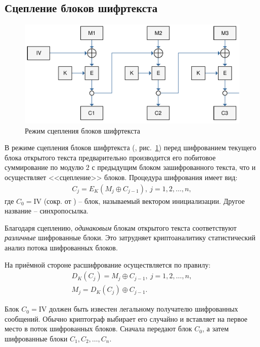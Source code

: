 \subsection{Сцепление блоков шифртекста}

\begin{figure}[bt]
	\centering
	\includegraphics[width=1\textwidth]{pic/CBC}
	\caption{Режим сцепления блоков шифртекста}
	\label{fig:CBC}
\end{figure}

В режиме сцепления блоков шифртекста (, рис.~\ref{fig:CBC}) перед шифрованием текущего блока открытого текста предварительно производится его побитовое суммирование по модулю $2$ с предыдущим блоком зашифрованного текста, что и осуществляет <<сцепление>> блоков. Процедура шифрования имеет вид:
\[ \begin{array}{l}
    C_j = E_K(M_j \oplus C_{j-1}), ~ j = 1, 2, \dots, n,
\end{array} \]
где $C_0 = \textrm{IV}$ (сокр. от ) -- блок, называемый вектором инициализации. Другое название -- синхропосылка.

Благодаря сцеплению, \emph{одинаковым} блокам открытого текста соответствуют \emph{различные} шифрованные блоки. Это затрудняет криптоаналитику статистический анализ потока шифрованных блоков.

На приёмной стороне расшифрование осуществляется по правилу:
\[ \begin{array}{l}
    D_K(C_j) = M_j \oplus C_{j-1}, ~ j=1, 2, \dots, n,\\
    M_{j} = D_K(C_j) \oplus C_{j-1}.
\end{array} \]

Блок $C_0 = \textrm{IV}$ должен быть известен легальному получателю шифрованных сообщений. Обычно криптограф выбирает его случайно и вставляет на первое место в поток шифрованных блоков. Сначала передают блок $C_0$, а затем шифрованные блоки $C_1, C_2, \ldots, C_n$.

